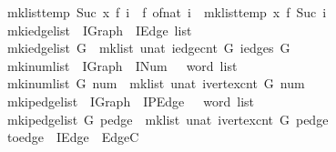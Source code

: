 \begin{isabellebody}
\ \ {\isachardoublequoteopen}mk{\isacharunderscore}list{\isacharprime}{\isacharunderscore}temp\ {\isacharparenleft}Suc\ x{\isacharparenright}\ f\ i\ {\isacharequal}\ {\isacharparenleft}f\ {\isacharparenleft}of{\isacharunderscore}nat\ i{\isacharparenright}{\isacharparenright}\ {\isacharhash}\ mk{\isacharunderscore}list{\isacharprime}{\isacharunderscore}temp\ x\ f\ {\isacharparenleft}Suc\ i{\isacharparenright}{\isachardoublequoteclose}\isanewline
\isanewline
\isanewline
{}\isamarkupfalse%
\isanewline
\ \ mk{\isacharunderscore}iedge{\isacharunderscore}list\ {\isacharcolon}{\isacharcolon}\ {\isachardoublequoteopen}IGraph\ {\isasymRightarrow}\ IEdge\ list{\isachardoublequoteclose}\ \isanewline
{}\ \isanewline
\ \ {\isachardoublequoteopen}mk{\isacharunderscore}iedge{\isacharunderscore}list\ G\ {\isacharequal}\ mk{\isacharunderscore}list{\isacharprime}\ {\isacharparenleft}unat\ {\isacharparenleft}iedge{\isacharunderscore}cnt\ G{\isacharparenright}{\isacharparenright}\ {\isacharparenleft}iedges\ G{\isacharparenright}{\isachardoublequoteclose}\isanewline
\isanewline
{}\isamarkupfalse%
\ \isanewline
\ \ mk{\isacharunderscore}inum{\isacharunderscore}list\ {\isacharcolon}{\isacharcolon}\ {\isachardoublequoteopen}IGraph\ {\isasymRightarrow}\ INum\ {\isasymRightarrow}\ {}{}\ word\ list{\isachardoublequoteclose}\ \isanewline
{}\ \isanewline
\ \ {\isachardoublequoteopen}mk{\isacharunderscore}inum{\isacharunderscore}list\ G\ num\ {\isacharequal}\ mk{\isacharunderscore}list{\isacharprime}\ {\isacharparenleft}unat\ {\isacharparenleft}ivertex{\isacharunderscore}cnt\ G{\isacharparenright}{\isacharparenright}\ num{\isachardoublequoteclose}\isanewline
\ \ \isanewline
{}\isamarkupfalse%
\ \isanewline
\ \ mk{\isacharunderscore}ipedge{\isacharunderscore}list\ {\isacharcolon}{\isacharcolon}\ {\isachardoublequoteopen}IGraph\ {\isasymRightarrow}\ IPEdge\ {\isasymRightarrow}\ {}{}\ word\ list{\isachardoublequoteclose}\ \isanewline
{}\ \isanewline
\ \ {\isachardoublequoteopen}mk{\isacharunderscore}ipedge{\isacharunderscore}list\ G\ pedge\ {\isacharequal}\ mk{\isacharunderscore}list{\isacharprime}\ {\isacharparenleft}unat\ {\isacharparenleft}ivertex{\isacharunderscore}cnt\ G{\isacharparenright}{\isacharparenright}\ pedge{\isachardoublequoteclose}\isanewline
\isanewline
\isanewline
{}\isamarkupfalse%
\ \isanewline
\ \ to{\isacharunderscore}edge\ {\isacharcolon}{\isacharcolon}\ {\isachardoublequoteopen}IEdge\ {\isasymRightarrow}\ Edge{\isacharunderscore}C{\isachardoublequoteclose}\ \isanewline

\end{isabellebody}
